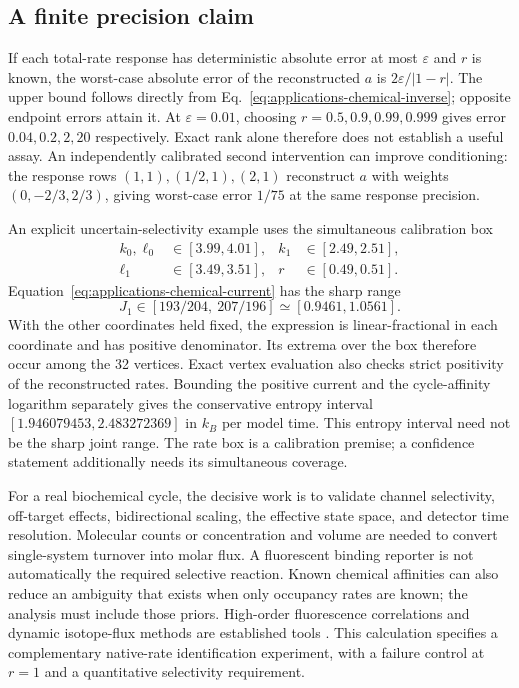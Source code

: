 \subsection{A finite precision claim}

If each total-rate response has deterministic absolute error at most
$\varepsilon$ and $r$ is known, the worst-case absolute error of the
reconstructed $a$ is $2\varepsilon/|1-r|$. The upper bound follows directly
from Eq.~\eqref{eq:applications-chemical-inverse}; opposite endpoint errors
attain it. At $\varepsilon=0.01$, choosing
$r=0.5,0.9,0.99,0.999$ gives error $0.04,0.2,2,20$ respectively. Exact rank
alone therefore does not establish a useful assay. An independently
calibrated second intervention can improve conditioning: the response rows
$(1,1),(1/2,1),(2,1)$ reconstruct $a$ with weights
$(0,-2/3,2/3)$, giving worst-case error $1/75$ at the same response precision.

An explicit uncertain-selectivity example uses the simultaneous calibration
box
\begin{align}
 k_0,\ell_0&\in[3.99,4.01],& k_1&\in[2.49,2.51],\nonumber\\
 \ell_1&\in[3.49,3.51],&r&\in[0.49,0.51].
\end{align}
Equation~\eqref{eq:applications-chemical-current} has the sharp range
\begin{equation}
 J_1\in[193/204,\ 207/196]\simeq[0.9461,1.0561].
 \label{eq:applications-chemical-interval}
\end{equation}
With the other coordinates held fixed, the expression is linear-fractional
in each coordinate and has positive denominator. Its extrema over the box
therefore occur among the 32 vertices. Exact vertex evaluation also checks
strict positivity of the reconstructed rates. Bounding the positive current
and the cycle-affinity logarithm separately gives the conservative entropy
interval $[1.946079453,2.483272369]$ in $k_B$ per model time. This entropy
interval need not be the sharp joint range. The rate box is a calibration
premise; a confidence statement additionally needs its simultaneous coverage.

For a real biochemical cycle, the decisive work is to validate channel
selectivity, off-target effects, bidirectional scaling, the effective state
space, and detector time resolution. Molecular counts or concentration and
volume are needed to convert single-system turnover into molar flux. A
fluorescent binding reporter is not automatically the required selective
reaction. Known chemical affinities can also reduce an ambiguity that exists
when only occupancy rates are known; the analysis must include those priors.
High-order fluorescence correlations and dynamic isotope-flux methods are
established tools \cite{physics-qian,physics-young}. This calculation specifies
a complementary native-rate identification experiment, with a failure
control at $r=1$ and a quantitative selectivity requirement.

